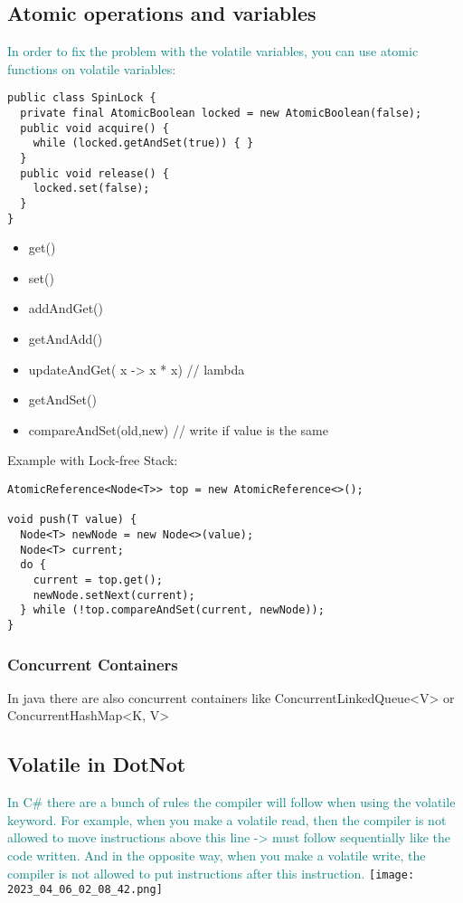 \documentclass[main.tex,fontsize=8pt,paper=a4,paper=portrait,DIV=calc,]{scrartcl}
\begin{document}
\subsection{Atomic operations and variables}
\textcolor{teal}{In order to fix the problem with the volatile variables, you can use atomic functions on volatile variables:}
\begin{lstlisting}
public class SpinLock {
  private final AtomicBoolean locked = new AtomicBoolean(false);
  public void acquire() {
    while (locked.getAndSet(true)) { }
  }
  public void release() {
    locked.set(false);
  }
}
\end{lstlisting}
\begin{itemize}
\item get() 
\item set()
\item addAndGet()
\item getAndAdd()
\item updateAndGet( x -> x * x) // lambda
\item getAndSet()
\item compareAndSet(old,new) // write if value is the same
\end{itemize} 
Example with Lock-free Stack:
\begin{lstlisting}
AtomicReference<Node<T>> top = new AtomicReference<>();

void push(T value) {
  Node<T> newNode = new Node<>(value);
  Node<T> current;
  do {
    current = top.get();
    newNode.setNext(current);
  } while (!top.compareAndSet(current, newNode));
}
\end{lstlisting}

\subsubsection{Concurrent Containers}
In java there are also concurrent containers like ConcurrentLinkedQueue<V> or ConcurrentHashMap<K, V>

\subsection{Volatile in DotNot}
\textcolor{teal}{In C# there are a bunch of rules the compiler will follow when using the volatile keyword.\newline
For example, when you make a volatile read, then the compiler is not allowed to move instructions above this line -> must follow sequentially like the code written.\newline
And in the opposite way, when you make a volatile write, the compiler is not allowed to put instructions after this instruction.}\newline
\texttt{[image: 2023\_04\_06\_02\_08\_42.png]}
\end{document}
